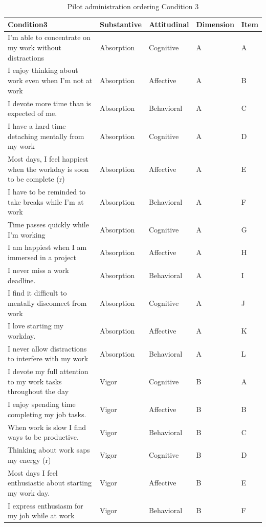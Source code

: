 \documentclass[
]{book}
\begin{document}
\begin{table}

\caption{\label{tab:conditions}Pilot administration ordering Condition 3}
\centering
\begin{tabular}[t]{l|l|l|l|l}
\hline
Condition3 & Substantive & Attitudinal & Dimension & Item\\
\hline
I’m able to concentrate on my work without distractions & Absorption & Cognitive & A & A\\
\hline
I enjoy thinking about work even when I’m not at work & Absorption & Affective & A & B\\
\hline
I devote more time than is expected of me. & Absorption & Behavioral & A & C\\
\hline
I have a hard time detaching mentally from my work & Absorption & Cognitive & A & D\\
\hline
Most days, I feel happiest when the workday is soon to be complete (r) & Absorption & Affective & A & E\\
\hline
I have to be reminded to take breaks while I’m at work & Absorption & Behavioral & A & F\\
\hline
Time passes quickly while I’m working & Absorption & Cognitive & A & G\\
\hline
I am happiest when I am immersed in a project & Absorption & Affective & A & H\\
\hline
I never miss a work deadline. & Absorption & Behavioral & A & I\\
\hline
I find it difficult to mentally disconnect from work & Absorption & Cognitive & A & J\\
\hline
I love starting my workday. & Absorption & Affective & A & K\\
\hline
I never allow distractions to interfere with my work & Absorption & Behavioral & A & L\\
\hline
I devote my full attention to my work tasks throughout the day & Vigor & Cognitive & B & A\\
\hline
I enjoy spending time completing my job tasks. & Vigor & Affective & B & B\\
\hline
When work is slow I find ways to be productive. & Vigor & Behavioral & B & C\\
\hline
Thinking about work saps my energy (r) & Vigor & Cognitive & B & D\\
\hline
Most days I feel enthusiastic about starting my work day. & Vigor & Affective & B & E\\
\hline
I express enthusiasm for my job while at work & Vigor & Behavioral & B & F\\

\end{tabular}
\end{table}
\end{document}

